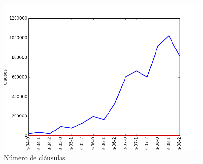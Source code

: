 		\begin{figure}[H]
			\centering
			\includegraphics[height=8cm]{images/blocks_clauses}
			\caption{Número de cláusulas}
			\label{fig:blocksclauses}
		\end{figure}
		
